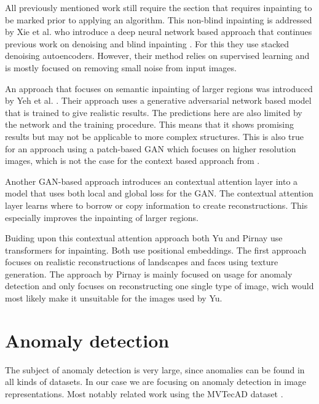 All previously mentioned work still require the section that requires inpainting to be marked prior to applying an algorithm. This non-blind inpainting is addressed by Xie et al. \cite{xie_image_2012} who introduce a deep neural network based approach that continues previous work on denoising \cite{mairal_sparse_2008} and blind inpainting \cite{dong_wavelet_2012}. For this they use stacked denoising autoencoders. However, their method relies on supervised learning and is mostly focused on removing small noise from input images.

An approach that focuses on semantic inpainting of larger regions was introduced by Yeh et al. \cite{yeh_semantic_2017}. Their approach uses a generative adversarial network based model that is trained to give realistic results. The predictions here are also limited by the network and the training procedure. This means that it shows promising results but may not be applicable to more complex structures. This is also true for an approach using a patch-based GAN \cite{demir_patch-based_2018} which focuses on higher resolution images, which is not the case for the context based approach from \cite{pathak_context_2016}.

Another GAN-based approach \cite{yu_generative_2018} introduces an contextual attention layer into a model that uses both local and global loss for the GAN. The contextual attention layer learns where to borrow or copy information to create reconstructions. This especially improves the inpainting of larger regions.

Buiding upon this contextual attention approach both Yu \cite{yu_diverse_2021} and Pirnay \cite{pirnay_inpainting_2021} use transformers for inpainting. Both use positional embeddings. The first approach focuses on realistic reconstructions of landscapes and faces using texture generation. The approach by Pirnay is mainly focused on usage for anomaly detection and only focuses on reconstructing one single type of image, wich would most likely make it unsuitable for the images used by Yu.

\section{Anomaly detection}
\label{sec:relwork:anomaly-detection}

The subject of anomaly detection is very large, since anomalies can be found in all kinds of datasets. In our case we are focusing on anomaly detection in image representations. Most notably related work using the MVTecAD dataset \cite{bergmann_mvtec_2019}.

